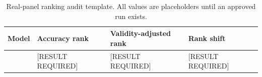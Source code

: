 \begin{table}[t]
\centering
\caption{Real-panel ranking audit template. All values are placeholders until an approved run exists.}
\begin{tabular}{llll}
\toprule
Model & Accuracy rank & Validity-adjusted rank & Rank shift \\
\midrule
[RESULT REQUIRED] & [RESULT REQUIRED] & [RESULT REQUIRED] & [RESULT REQUIRED] \\
\bottomrule
\end{tabular}
\end{table}
